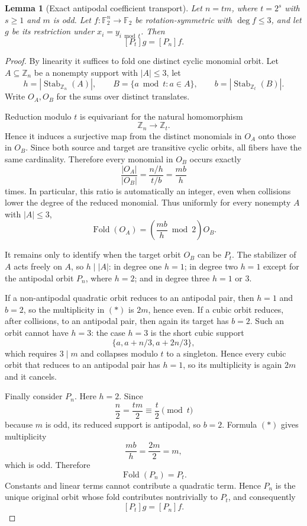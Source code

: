 \documentclass[11pt,a4paper]{article}
\newtheorem{lemma}[theorem]{Lemma}
\theoremstyle{remark}
\theoremstyle{plain}
\newcommand{\F}{\mathbb F_2}
\begin{document}
\begin{lemma}[Exact antipodal coefficient transport]\label{lem:antipodal-transport}
Let $n=tm$, where $t=2^s$ with $s\ge1$ and $m$ is odd. Let $f:\F^n\to\F$ be rotation-symmetric with $\deg f\le3$, and let $g$ be its restriction under $x_i=y_{i\bmod t}$. Then
\[
\boxed{[P_t]g=[P_n]f.}
\]
\end{lemma}
\begin{proof}
By linearity it suffices to fold one distinct cyclic monomial orbit. Let $A\subseteq\mathbb Z_n$ be a nonempty support with $|A|\le3$, let
\[
h=|\operatorname{Stab}_{\mathbb Z_n}(A)|,\qquad
B=\{a\bmod t:a\in A\},\qquad
b=|\operatorname{Stab}_{\mathbb Z_t}(B)|.
\]
Write $O_A,O_B$ for the sums over distinct translates.

Reduction modulo $t$ is equivariant for the natural homomorphism
\[
\mathbb Z_n\longrightarrow\mathbb Z_t.
\]
Hence it induces a surjective map from the distinct monomials in $O_A$ onto those in $O_B$. Since both source and target are transitive cyclic orbits, all fibers have the same cardinality. Therefore every monomial in $O_B$ occurs exactly
\[
\frac{|O_A|}{|O_B|}
=
\frac{n/h}{t/b}
=
\frac{mb}{h}
\]
times. In particular, this ratio is automatically an integer, even when collisions lower the degree of the reduced monomial. Thus uniformly for every nonempty $A$ with $|A|\le3$,
\[
\boxed{
\operatorname{Fold}(O_A)
=
\left(\frac{mb}{h}\bmod2\right)O_B.
}
\tag{*}
\]

It remains only to identify when the target orbit $O_B$ can be $P_t$. The stabilizer of $A$ acts freely on $A$, so $h\mid |A|$: in degree one $h=1$; in degree two $h=1$ except for the antipodal orbit $P_n$, where $h=2$; and in degree three $h=1$ or $3$.

If a non-antipodal quadratic orbit reduces to an antipodal pair, then $h=1$ and $b=2$, so the multiplicity in \((*)\) is $2m$, hence even. If a cubic orbit reduces, after collisions, to an antipodal pair, then again its target has $b=2$. Such an orbit cannot have $h=3$: the case $h=3$ is the short cubic support
\[
\{a,a+n/3,a+2n/3\},
\]
which requires $3\mid m$ and collapses modulo $t$ to a singleton. Hence every cubic orbit that reduces to an antipodal pair has $h=1$, so its multiplicity is again $2m$ and it cancels.

Finally consider $P_n$. Here $h=2$. Since
\[
\frac n2=\frac{tm}{2}\equiv \frac t2\pmod t
\]
because $m$ is odd, its reduced support is antipodal, so $b=2$. Formula \((*)\) gives multiplicity
\[
\frac{mb}{h}=\frac{2m}{2}=m,
\]
which is odd. Therefore
\[
\operatorname{Fold}(P_n)=P_t.
\]
Constants and linear terms cannot contribute a quadratic term. Hence $P_n$ is the unique original orbit whose fold contributes nontrivially to $P_t$, and consequently
\[
[P_t]g=[P_n]f.
\]
\end{proof}
\end{document}
